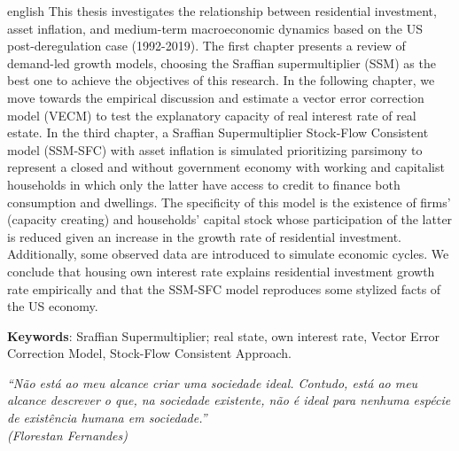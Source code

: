 \documentclass[12pt,openright,oneside,a4paper,english,sumario=tradicional]{gpsabntex}
\numberwithin{listing}{chapter}
\begin{document}
\begin{resumo}
\begin{otherlanguage*}{english}
	This thesis investigates the relationship between residential investment, asset inflation, and medium-term macroeconomic dynamics based on the US post-deregulation case  (1992-2019). 
	The first chapter presents a review of demand-led growth models, choosing the Sraffian supermultiplier (SSM) as the best one to achieve the objectives of this research. 
	In the following chapter, we move towards the empirical discussion and estimate a vector error correction model (VECM) to test the explanatory capacity of real interest rate of real estate. 
	In the third chapter, a Sraffian Supermultiplier Stock-Flow Consistent model (SSM-SFC) with asset inflation is simulated prioritizing parsimony to represent a closed and without government economy with working and capitalist households in which only the latter have access to credit to finance both consumption and dwellings. 
	The specificity of this model is the existence of firms' (capacity creating) and households' capital stock  whose participation of the latter is reduced given an increase in the growth rate of residential investment. 
	Additionally, some observed data are introduced to simulate economic cycles. 
 	We conclude that housing own interest rate explains residential investment growth rate empirically and that the SSM-SFC model reproduces some stylized facts of the US economy.
	
	\vspace{\onelineskip}
	
	\noindent\textbf{Keywords}: Sraffian Supermultiplier; real state, own interest rate, Vector Error Correction Model, Stock-Flow Consistent Approach. 
	
\end{otherlanguage*}
\end{resumo}

\begin{epigrafe}
\thispagestyle{empty} %
	\vspace*{\fill}
	\begin{flushright}
		\textit{``Não está ao meu alcance criar uma sociedade ideal. Contudo, está ao meu alcance descrever o que, na sociedade existente, não é ideal para nenhuma espécie de existência humana em sociedade.''\\
			(Florestan Fernandes)}
	\end{flushright}
\end{epigrafe}

\newpage

\listoffigures*
{}
\thispagestyle{empty}
\newpage
{}
\listoftables*
{}
\thispagestyle{empty}
\newpage
{}

\thispagestyle{empty}
\newpage
\end{document}
